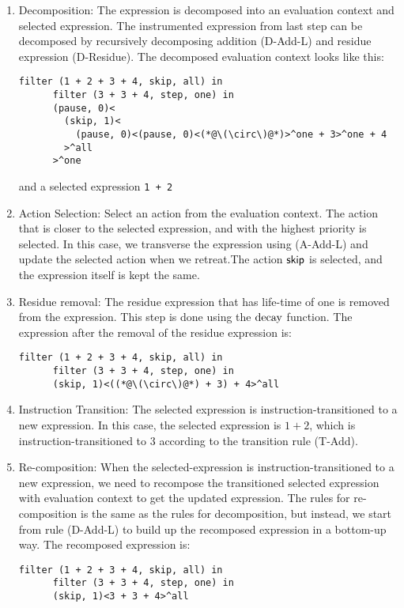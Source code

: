 \begin{enumerate}
  \item Decomposition: The expression is decomposed into an evaluation context and selected expression. The instrumented expression from last step can be decomposed by recursively decomposing addition (D-Add-L) and residue expression (D-Residue). The decomposed evaluation context looks like this:
    \begin{lstlisting}[language=hazel]
      filter (1 + 2 + 3 + 4, skip, all) in
      filter (3 + 3 + 4, step, one) in
      (pause, 0)<
        (skip, 1)<
          (pause, 0)<(pause, 0)<(*@\(\circ\)@*)>^one + 3>^one + 4
        >^all
      >^one
    \end{lstlisting}
    and a selected expression \lstinline{1 + 2}

  \item Action Selection: Select an action from the evaluation context. The action that is closer to the selected expression, and with the highest priority is selected. In this case, we transverse the expression using (A-Add-L) and update the selected action when we retreat.The action \(\mathsf{skip}\) is selected, and the expression itself is kept the same.

  \item Residue removal: The residue expression that has life-time of one is removed from the expression. This step is done using the \(\operatorname{decay}\) function. The expression after the removal of the residue expression is:
    \begin{lstlisting}[language=hazel]
      filter (1 + 2 + 3 + 4, skip, all) in
      filter (3 + 3 + 4, step, one) in
      (skip, 1)<((*@\(\circ\)@*) + 3) + 4>^all
    \end{lstlisting}
  \item Instruction Transition: The selected expression is instruction-transitioned to a new expression. In this case, the selected expression is \(1 + 2\), which is instruction-transitioned to \(3\) according to the transition rule (T-Add).

  \item Re-composition: When the selected-expression is instruction-transitioned to a new expression, we need to recompose the transitioned selected expression with evaluation context to get the updated expression. The rules for re-composition is the same as the rules for decomposition, but instead, we start from rule (D-Add-L) to build up the recomposed expression in a bottom-up way. The recomposed expression is:
    \begin{lstlisting}[language=hazel]
      filter (1 + 2 + 3 + 4, skip, all) in
      filter (3 + 3 + 4, step, one) in
      (skip, 1)<3 + 3 + 4>^all
    \end{lstlisting}


\end{enumerate}
